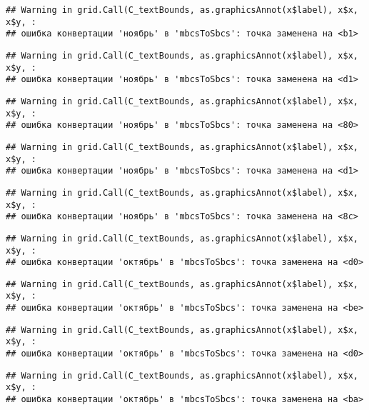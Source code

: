 \documentclass[
]{article}
\begin{document}
\begin{verbatim}
## Warning in grid.Call(C_textBounds, as.graphicsAnnot(x$label), x$x, x$y, :
## ошибка конвертации 'ноябрь' в 'mbcsToSbcs': точка заменена на <b1>
\end{verbatim}

\begin{verbatim}
## Warning in grid.Call(C_textBounds, as.graphicsAnnot(x$label), x$x, x$y, :
## ошибка конвертации 'ноябрь' в 'mbcsToSbcs': точка заменена на <d1>
\end{verbatim}

\begin{verbatim}
## Warning in grid.Call(C_textBounds, as.graphicsAnnot(x$label), x$x, x$y, :
## ошибка конвертации 'ноябрь' в 'mbcsToSbcs': точка заменена на <80>
\end{verbatim}

\begin{verbatim}
## Warning in grid.Call(C_textBounds, as.graphicsAnnot(x$label), x$x, x$y, :
## ошибка конвертации 'ноябрь' в 'mbcsToSbcs': точка заменена на <d1>
\end{verbatim}

\begin{verbatim}
## Warning in grid.Call(C_textBounds, as.graphicsAnnot(x$label), x$x, x$y, :
## ошибка конвертации 'ноябрь' в 'mbcsToSbcs': точка заменена на <8c>
\end{verbatim}

\begin{verbatim}
## Warning in grid.Call(C_textBounds, as.graphicsAnnot(x$label), x$x, x$y, :
## ошибка конвертации 'октябрь' в 'mbcsToSbcs': точка заменена на <d0>
\end{verbatim}

\begin{verbatim}
## Warning in grid.Call(C_textBounds, as.graphicsAnnot(x$label), x$x, x$y, :
## ошибка конвертации 'октябрь' в 'mbcsToSbcs': точка заменена на <be>
\end{verbatim}

\begin{verbatim}
## Warning in grid.Call(C_textBounds, as.graphicsAnnot(x$label), x$x, x$y, :
## ошибка конвертации 'октябрь' в 'mbcsToSbcs': точка заменена на <d0>
\end{verbatim}

\begin{verbatim}
## Warning in grid.Call(C_textBounds, as.graphicsAnnot(x$label), x$x, x$y, :
## ошибка конвертации 'октябрь' в 'mbcsToSbcs': точка заменена на <ba>
\end{verbatim}
\end{document}
